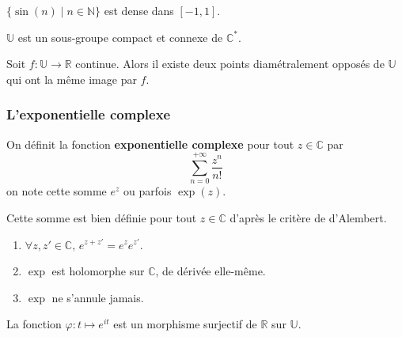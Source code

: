   \begin{application}
    $\{ \sin(n) \mid n \in \mathbb{N} \}$ est dense dans $[-1,1]$.
  \end{application}


  \begin{proposition}
    $\mathbb{U}$ est un sous-groupe compact et connexe de $\mathbb{C}^*$.
  \end{proposition}

  \begin{application}
    Soit $f : \mathbb{U} \rightarrow \mathbb{R}$ continue. Alors il existe deux points diamétralement opposés de $\mathbb{U}$ qui ont la même image par $f$.
  \end{application}

  \subsubsection{L'exponentielle complexe}


  \begin{definition}
    On définit la fonction \textbf{exponentielle complexe} pour tout $z \in \mathbb{C}$ par
    \[ \sum_{n=0}^{+\infty} \frac{z^n}{n!} \]
    on note cette somme $e^z$ ou parfois $\exp(z)$.
  \end{definition}

  \begin{remark}
    Cette somme est bien définie pour tout $z \in \mathbb{C}$ d'après le critère de d'Alembert.
  \end{remark}

  \begin{proposition}
    \begin{enumerate}[label={\bfseries(\roman*)}]
      \item $\forall z, z' \in \mathbb{C}, \, e^{z+z'} = e^z e^{z'}$.
      \item $\exp$ est holomorphe sur $\mathbb{C}$, de dérivée elle-même.
      \item $\exp$ ne s'annule jamais.
    \end{enumerate}
  \end{proposition}

  \begin{proposition}
    La fonction $\varphi : t \mapsto e^{it}$ est un morphisme surjectif de $\mathbb{R}$ sur $\mathbb{U}$.
  \end{proposition}

